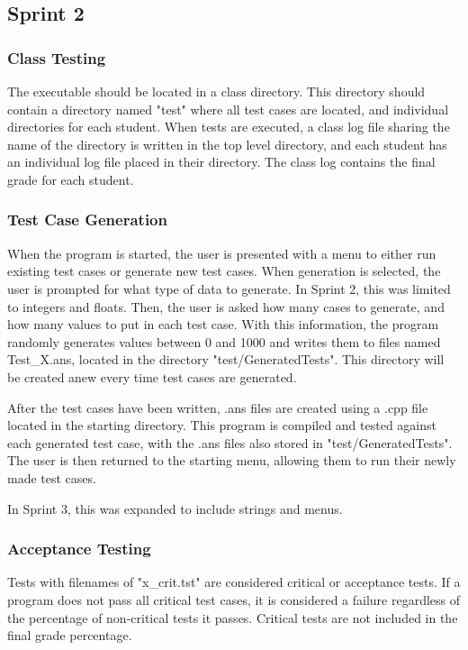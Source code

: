 \subsection{Sprint 2}

\subsubsection{Class Testing}
The executable should be located in a class directory. This directory should contain a directory named "test" where all test cases are located, and individual directories for each student. When tests are executed, a class log file sharing the name of the directory is written in the top level directory, and each student has an individual log file placed in their directory. The class log contains the final grade for each student.

\subsubsection{Test Case Generation}
When the program is started, the user is presented with a menu to either run existing test cases or generate new test cases. When generation is selected, the user is prompted for what type of data to generate. In Sprint 2, this was limited to integers and floats. Then, the user is asked how many cases to generate, and how many values to put in each test case. With this information, the program randomly generates values between 0 and 1000 and writes them to files named Test\_X.ans, located in the directory "test/GeneratedTests". This directory will be created anew every time test cases are generated. 

After the test cases have been written, .ans files are created using a .cpp file located in the starting directory. This program is compiled and tested against each generated test case, with the .ans files also stored in "test/GeneratedTests". The user is then returned to the starting menu, allowing them to run their newly made test cases.

In Sprint 3, this was expanded to include strings and menus.

\subsubsection {Acceptance Testing}
Tests with filenames of "x\_crit.tst" are considered critical or acceptance tests. If a program does not pass all critical test cases, it is considered a failure regardless of the percentage of non-critical tests it passes. Critical tests are not included in the final grade percentage.  

